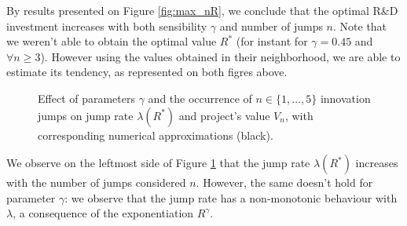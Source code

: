 By results presented on Figure \ref{fig:max_nR}, we conclude that the optimal R\&D investment increases with both sensibility $\gamma$ and number of jumps $n$. Note that we weren't able to obtain the optimal value $R^*$ (for instant for $\gamma=0.45$ and $\forall n\geq 3$). However using the values obtained in their neighborhood, we are able to estimate its tendency, as represented on both figres above.

\begin{figure}[!htb]
	\begin{subfigmatrix}{2}
	\end{subfigmatrix}
	\caption{Effect of parameters $\gamma$ and the occurrence of $n\in \{1,...,5\}$ innovation jumps on jump rate $\lambda(R^*)$ and project's value $V_n$, with corresponding numerical approximations (black). }
	\label{fig:max_n}
\end{figure}


We observe on the leftmost side of Figure \ref{fig:max_n} that the jump rate $\lambda(R^*)$ increases with the number of jumps considered $n$. However, the same doesn't hold for parameter $\gamma$: we observe that the jump rate has a non-monotonic behaviour with $\lambda$, a consequence of the exponentiation $R^\gamma$.




